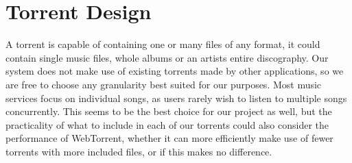 \section{Torrent Design}
A torrent is capable of containing one or many files of any format, 
it could contain single music files, whole albums or an artists entire discography.
Our system does not make use of existing torrents made by other applications,
so we are free to choose any granularity best suited for our purposes.
Most music services focus on individual songs, 
as users rarely wish to listen to multiple songs concurrently.
This seems to be the best choice for our project as well, 
but the practicality of what to include in each of our torrents 
could also consider the performance of WebTorrent,
whether it can more efficiently make use of fewer torrents with more included files, 
or if this makes no difference.
